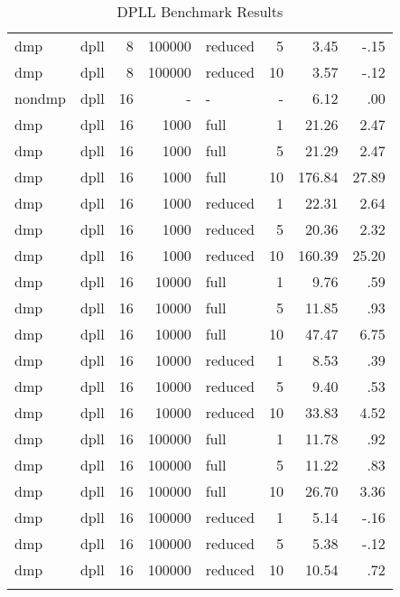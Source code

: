 \begin{center}
\begin{small}
\begin{longtable}{llrrlrrr}
dmp & dpll & 8 & 100000 & reduced & 5 & 3.45 & -.15\\
dmp & dpll & 8 & 100000 & reduced & 10 & 3.57 & -.12\\
\hline
nondmp & dpll & 16 & - & - & - & 6.12 & .00\\
dmp & dpll & 16 & 1000 & full & 1 & 21.26 & 2.47\\
dmp & dpll & 16 & 1000 & full & 5 & 21.29 & 2.47\\
dmp & dpll & 16 & 1000 & full & 10 & 176.84 & 27.89\\
dmp & dpll & 16 & 1000 & reduced & 1 & 22.31 & 2.64\\
dmp & dpll & 16 & 1000 & reduced & 5 & 20.36 & 2.32\\
dmp & dpll & 16 & 1000 & reduced & 10 & 160.39 & 25.20\\
dmp & dpll & 16 & 10000 & full & 1 & 9.76 & .59\\
dmp & dpll & 16 & 10000 & full & 5 & 11.85 & .93\\
dmp & dpll & 16 & 10000 & full & 10 & 47.47 & 6.75\\
dmp & dpll & 16 & 10000 & reduced & 1 & 8.53 & .39\\
dmp & dpll & 16 & 10000 & reduced & 5 & 9.40 & .53\\
dmp & dpll & 16 & 10000 & reduced & 10 & 33.83 & 4.52\\
dmp & dpll & 16 & 100000 & full & 1 & 11.78 & .92\\
dmp & dpll & 16 & 100000 & full & 5 & 11.22 & .83\\
dmp & dpll & 16 & 100000 & full & 10 & 26.70 & 3.36\\
dmp & dpll & 16 & 100000 & reduced & 1 & 5.14 & -.16\\
dmp & dpll & 16 & 100000 & reduced & 5 & 5.38 & -.12\\
dmp & dpll & 16 & 100000 & reduced & 10 & 10.54 & .72\\
\hline
\caption{DPLL Benchmark Results}
\label{tab:dpll_results}
\end{longtable}
\end{small}
\end{center}

